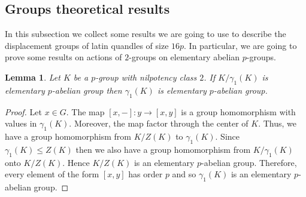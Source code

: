 \documentclass[a4paper, english, 9pt]{amsart}
\theoremstyle{plain}
\newtheorem{lemma}[theorem]{Lemma}
\theoremstyle{definition}
\def\comment#1{{\color{red} #1}}
\def\Z{\mathbb Z}
\begin{document}
   


\subsection{Groups theoretical results}

In this subsection we collect some results we are going to use to describe the displacement groups of latin quandles of size $16p$. In particular, we are going to prove some results on actions of $2$-groups on elementary abelian $p$-groups.


\begin{lemma}\label{derived si elemetary}
    Let $K$ be a $p$-group with nilpotency class $2$. If $K/\gamma_1(K)$ is elementary $p$-abelian group then $\gamma_1(K)$ is elementary $p$-abelian group.
\end{lemma}

\begin{proof}
    Let $x\in G$. The map $[x,-]:y\longrightarrow [x,y]$ is a group homomorphism with values in $\gamma_1(K)$. Moreover, the map factor through the center of $K$. Thus, we have a group homomorphism from $K/Z(K)$ to $\gamma_1(K)$. Since $\gamma_1(K)\leq Z(K)$ then we also have a group homomorphism from $K/\gamma_1(K)$ onto $K/Z(K)$. Hence $K/Z(K)$ is an elementary $p$-abelian group. Therefore, every element of the form $[x,y]$ has order $p$ and so $\gamma_1(K)$ is an elementary $p$-abelian group.
\end{proof}
\end{document}

